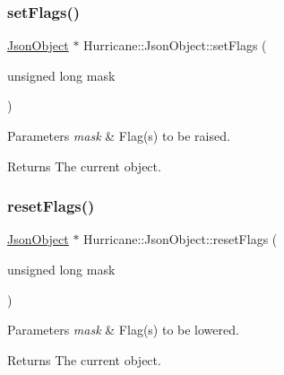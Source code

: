 \mbox{\label{classHurricane_1_1JsonObject_a5216e5f5d74f8dbf8665eef8a78b2fe1}} 
\subsubsection{\texorpdfstring{set\+Flags()}{setFlags()}}
{\footnotesize\ttfamily \hyperlink{classHurricane_1_1JsonObject}{Json\+Object} $\ast$ Hurricane\+::\+Json\+Object\+::set\+Flags (\begin{DoxyParamCaption}\item[{unsigned long}]{mask }\end{DoxyParamCaption})\hspace{0.3cm}{\ttfamily [inline]}}


\begin{DoxyParams}{Parameters}
{\em mask} & Flag(s) to be raised. \\
\hline
\end{DoxyParams}
\begin{DoxyReturn}{Returns}
The current object. 
\end{DoxyReturn}
\mbox{\label{classHurricane_1_1JsonObject_a8346b1c958574275fe17f9c4cb40ee8b}} 
\subsubsection{\texorpdfstring{reset\+Flags()}{resetFlags()}}
{\footnotesize\ttfamily \hyperlink{classHurricane_1_1JsonObject}{Json\+Object} $\ast$ Hurricane\+::\+Json\+Object\+::reset\+Flags (\begin{DoxyParamCaption}\item[{unsigned long}]{mask }\end{DoxyParamCaption})\hspace{0.3cm}{\ttfamily [inline]}}


\begin{DoxyParams}{Parameters}
{\em mask} & Flag(s) to be lowered. \\
\hline
\end{DoxyParams}
\begin{DoxyReturn}{Returns}
The current object. 
\end{DoxyReturn}
\mbox{\label{classHurricane_1_1JsonObject_a267c55a1989a9907e25632d820681779}} 
